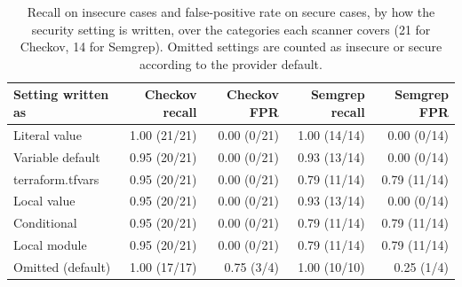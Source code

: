 \begin{table}[t]
\centering
\caption{Recall on insecure cases and false-positive rate on secure cases, by how the security setting is written, over the categories each scanner covers (21 for Checkov, 14 for Semgrep). Omitted settings are counted as insecure or secure according to the provider default.}
\label{tab:idioms}
\small
\begin{tabular}{lrrrr}
\toprule
Setting written as & Checkov recall & Checkov FPR & Semgrep recall & Semgrep FPR \\
\midrule
Literal value & 1.00 (21/21) & 0.00 (0/21) & 1.00 (14/14) & 0.00 (0/14) \\
Variable default & 0.95 (20/21) & 0.00 (0/21) & 0.93 (13/14) & 0.00 (0/14) \\
terraform.tfvars & 0.95 (20/21) & 0.00 (0/21) & 0.79 (11/14) & 0.79 (11/14) \\
Local value & 0.95 (20/21) & 0.00 (0/21) & 0.93 (13/14) & 0.00 (0/14) \\
Conditional & 0.95 (20/21) & 0.00 (0/21) & 0.79 (11/14) & 0.79 (11/14) \\
Local module & 0.95 (20/21) & 0.00 (0/21) & 0.79 (11/14) & 0.79 (11/14) \\
Omitted (default) & 1.00 (17/17) & 0.75 (3/4) & 1.00 (10/10) & 0.25 (1/4) \\
\bottomrule
\end{tabular}
\end{table}

